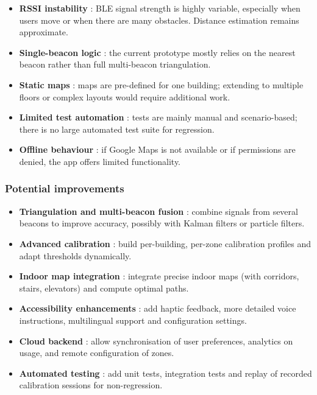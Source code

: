 \documentclass[12pt,a4paper]{article}
\begin{document}
\begin{itemize}
    \item \textbf{RSSI instability} : BLE signal strength is highly variable, especially when users move or when there are many obstacles. Distance estimation remains approximate.

    \item \textbf{Single-beacon logic} : the current prototype mostly relies on the nearest beacon rather than full multi-beacon triangulation.

    \item \textbf{Static maps} : maps are pre-defined for one building; extending to multiple floors or complex layouts would require additional work.

    \item \textbf{Limited test automation} : tests are mainly manual and scenario-based; there is no large automated test suite for regression.

    \item \textbf{Offline behaviour} : if Google Maps is not available or if permissions are denied, the app offers limited functionality.
\end{itemize}

\subsubsection{Potential improvements}

\begin{itemize}
    \item \textbf{Triangulation and multi-beacon fusion} : combine signals from several beacons to improve accuracy, possibly with Kalman filters or particle filters.

    \item \textbf{Advanced calibration} : build per-building, per-zone calibration profiles and adapt thresholds dynamically.

    \item \textbf{Indoor map integration} : integrate precise indoor maps (with corridors, stairs, elevators) and compute optimal paths.

    \item \textbf{Accessibility enhancements} : add haptic feedback, more detailed voice instructions, multilingual support and configuration settings.

    \item \textbf{Cloud backend} : allow synchronisation of user preferences, analytics on usage, and remote configuration of zones.

    \item \textbf{Automated testing} : add unit tests, integration tests and replay of recorded calibration sessions for non-regression.
\end{itemize}
\end{document}

